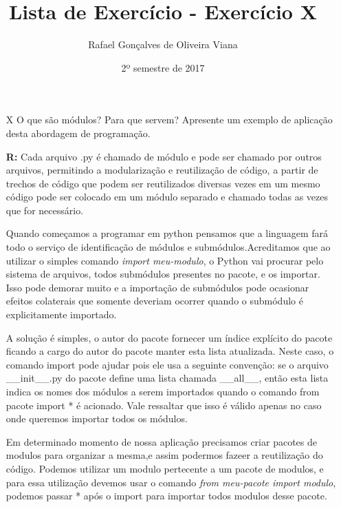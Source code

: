 \documentclass[12pt]{article}
\title{Lista de Exercício  - Exercício X }
\author{Rafael Gonçalves de  Oliveira Viana}
\date{2º semestre de 2017}
\begin{document}
\maketitle

\begin{enumerate}
\item[X]
O que são módulos? Para que servem? Apresente um exemplo de aplicação desta
abordagem de programação.

\textbf{R:}
Cada arquivo .py é chamado de módulo e pode ser chamado por outros arquivos, permitindo a modularização e reutilização de código, a partir de trechos de código que podem ser reutilizados diversas vezes em um mesmo código pode ser colocado em um módulo separado e chamado todas as vezes que for necessário.

Quando começamos a programar em python pensamos que a linguagem fará todo o serviço de identificação de módulos e submódulos.Acreditamos que ao utilizar o simples comando \textit{import meu-modulo}, o Python vai procurar pelo sistema de arquivos, todos submódulos presentes no pacote, e os importar. Isso pode demorar muito e a importação de submódulos pode ocasionar efeitos colaterais que somente deveriam ocorrer quando o submódulo é explicitamente importado.

A solução é simples, o autor do pacote fornecer um índice explícito do pacote ficando a cargo do autor do pacote manter esta lista atualizada. Neste caso, o comando import pode ajudar pois ele usa a seguinte convenção: se o arquivo \_\_init\_\_.py do pacote define uma lista chamada \_\_all\_\_, então esta lista indica os nomes dos módulos a serem importados quando o comando from pacote import * é acionado. Vale ressaltar que isso é válido apenas no caso onde queremos importar todos os módulos.

Em determinado momento de nossa aplicação precisamos criar pacotes de modulos para organizar a mesma,e assim podermos fazeer a reutilização do código. Podemos utilizar um modulo pertecente a um pacote de modulos, e para essa utilização devemos usar o comando \textit{from meu-pacote import modulo}, podemos passar * após o import para importar todos modulos desse pacote.


\inputminted{python}{Exemplo-9/App.py}


\end{enumerate}
\end{document}
